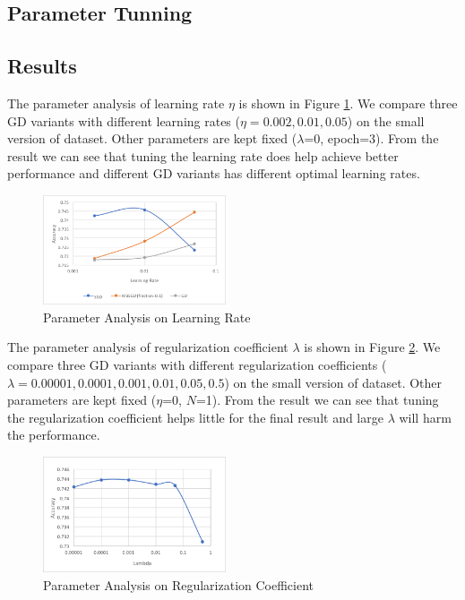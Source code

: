 \documentclass[sigconf]{acmart}
\begin{document}
\subsection{Parameter Tunning}
\label{subsection:parameterTunning}

\subsection{Results}
\label{subsection:results}

The parameter analysis of learning rate $\eta$ is shown in Figure \ref{lr}. We compare three GD variants with different learning rates ($\eta = 0.002, 0.01, 0.05$) on the small version of dataset. Other parameters are kept fixed ($\lambda$=0, epoch=3). From the result we can see that tuning the learning rate does help achieve better performance and different GD variants has different optimal learning rates.

\begin{figure}[ht]
\centering
\includegraphics[width=0.48\textwidth]{lr.png}
\caption{Parameter Analysis on Learning Rate}
\label{lr}
\end{figure}

The parameter analysis of regularization coefficient $\lambda$ is shown in Figure \ref{reg}. We compare three GD variants with different regularization coefficients ($\lambda = 0.00001, 0.0001, 0.001, 0.01, 0.05, 0.5$) on the small version of dataset. Other parameters are kept fixed ($\eta$=0, $N$=1). From the result we can see that tuning the regularization coefficient helps little for the final result and large $\lambda$ will harm the performance.

\begin{figure}[ht]
\centering
\includegraphics[width=0.48\textwidth]{reg.png}
\caption{Parameter Analysis on Regularization Coefficient}
\label{reg}
\end{figure}
\end{document}
